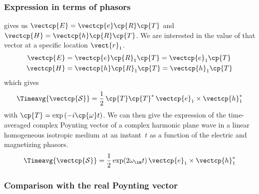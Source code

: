 \begin{refsection}

\subsubsection{Expression in terms of phasors}

 gives us $\vectcp{E} = \vectcp{e} \cp{R} \cp{T}$
and $\vectcp{H} = \vectcp{h} \cp{R} \cp{T}$.
We are interested in the value of that vector at a specific location $\vect{r}_1$.
\begin{align}
    \vectcp{E} &= \vectcp{e} \cp{R}_1 \cp{T} = \vectcp{e}_1 \cp{T} \\
    \vectcp{H} &= \vectcp{h} \cp{R}_1 \cp{T} = \vectcp{h}_1 \cp{T}
\end{align}
which gives
\begin{equation}
    \Timeavg{\vectcp{\mathcal{S}}} =
    \frac{1}{2}
    \,
    \cp{T}\cp{T}^*
    \,
    \vectcp{e}_1 \times \vectcp{h}_1^*
\end{equation}
with $\cp{T} = \exp\left(-i \cp{\omega} t \right)$.
We can then give the expression of the time-averaged complex Poynting vector of a complex harmonic plane wave in a linear homogeneous isotropic medium at an instant~$t$ as a function of the electric and magnetizing phasors.
\begin{equation}
    \Timeavg{\vectcp{\mathcal{S}}}
    =
    \frac{1}{2}
    \exp(2\omega_\im t)
    \,
    \vectcp{e}_1 \times \vectcp{h}_1^*
    \label{eq:time_avg_cplx_poynting_phasors}
\end{equation}



\subsubsection{Comparison with the real Poynting vector}


\end{refsection}
